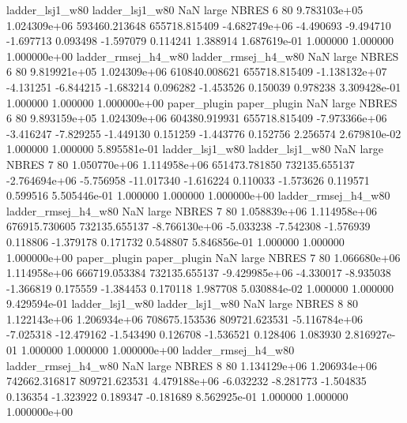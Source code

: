     ladder_lsj1_w80     ladder_lsj1_w80                   NaN      large    NBRES                 6 80 9.783103e+05   1.024309e+06 593460.213648  655718.815409 -4.682749e+06     -4.490693     -9.494710    -1.697713       0.093498 -1.597079   0.114241     1.388914   1.687619e-01            1.000000        1.000000        1.000000e+00
ladder_rmsej_h4_w80 ladder_rmsej_h4_w80                   NaN      large    NBRES                 6 80 9.819921e+05   1.024309e+06 610840.008621  655718.815409 -1.138132e+07     -4.131251     -6.844215    -1.683214       0.096282 -1.453526   0.150039     0.978238   3.309428e-01            1.000000        1.000000        1.000000e+00
       paper_plugin        paper_plugin                   NaN      large    NBRES                 6 80 9.893159e+05   1.024309e+06 604380.919931  655718.815409 -7.973366e+06     -3.416247     -7.829255    -1.449130       0.151259 -1.443776   0.152756     2.256574   2.679810e-02            1.000000        1.000000        5.895581e-01
    ladder_lsj1_w80     ladder_lsj1_w80                   NaN      large    NBRES                 7 80 1.050770e+06   1.114958e+06 651473.781850  732135.655137 -2.764694e+06     -5.756958    -11.017340    -1.616224       0.110033 -1.573626   0.119571     0.599516   5.505446e-01            1.000000        1.000000        1.000000e+00
ladder_rmsej_h4_w80 ladder_rmsej_h4_w80                   NaN      large    NBRES                 7 80 1.058839e+06   1.114958e+06 676915.730605  732135.655137 -8.766130e+06     -5.033238     -7.542308    -1.576939       0.118806 -1.379178   0.171732     0.548807   5.846856e-01            1.000000        1.000000        1.000000e+00
       paper_plugin        paper_plugin                   NaN      large    NBRES                 7 80 1.066680e+06   1.114958e+06 666719.053384  732135.655137 -9.429985e+06     -4.330017     -8.935038    -1.366819       0.175559 -1.384453   0.170118     1.987708   5.030884e-02            1.000000        1.000000        9.429594e-01
    ladder_lsj1_w80     ladder_lsj1_w80                   NaN      large    NBRES                 8 80 1.122143e+06   1.206934e+06 708675.153536  809721.623531 -5.116784e+06     -7.025318    -12.479162    -1.543490       0.126708 -1.536521   0.128406     1.083930   2.816927e-01            1.000000        1.000000        1.000000e+00
ladder_rmsej_h4_w80 ladder_rmsej_h4_w80                   NaN      large    NBRES                 8 80 1.134129e+06   1.206934e+06 742662.316817  809721.623531  4.479188e+06     -6.032232     -8.281773    -1.504835       0.136354 -1.323922   0.189347    -0.181689   8.562925e-01            1.000000        1.000000        1.000000e+00
